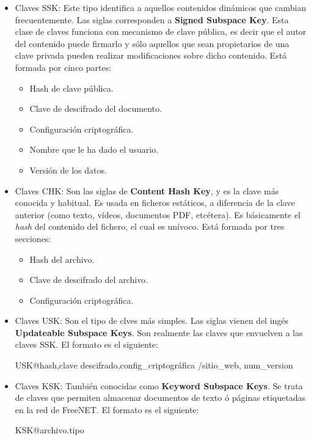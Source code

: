 \begin{itemize}
	\item {Claves SSK}: Este tipo identifica a aquellos contenidos dinámicos que cambian frecuentemente. Las siglas corresponden a \textbf{Signed Subspace Key}. Esta clase de claves funciona con mecanismo de clave pública, es decir que el autor del contenido puede firmarlo y sólo aquellos que sean propietarios de una clave privada pueden realizar modificaciones sobre dicho contenido. Está formada por cinco partes:
	\begin{itemize}
		\item {Hash de clave pública}.
		\item {Clave de descifrado del documento}.
		\item {Configuración criptográfica}.
		\item {Nombre que le ha dado el usuario}.
		\item {Versión de los datos}.
	\end{itemize}
	\item {Claves CHK}: Son las siglas de \textbf{Content Hash Key}, y es la clave más conocida y habitual. Es usada en ficheros estáticos, a diferencia de la clave anterior (como texto, vídeos, documentos PDF, etcétera). Es básicamente el \textit{hash} del contenido del fichero, el cual es unívoco. Está formada por tres secciones:
	\begin{itemize}
		\item {Hash del archivo}.
		\item {Clave de descifrado del archivo}.
		\item {Configuración criptográfica}.
	\end{itemize}
	\item {Claves USK}: Son el tipo de clves más simples. Las siglas vienen del ingés \textbf{Updateable Subspace Keys}. Son realmente las claves que envuelven a las claves SSK. El formato es el siguiente:
	
	{\selectfont 
		USK@hash,clave	descifrado,config\_criptográfica /sitio\_web, num\_version
	}
	
	\item {Claves KSK}: También conocidas como \textbf{Keyword Subspace Keys}. Se trata de claves que permiten almacenar documentos de texto ó páginas etiquetadas en la red de FreeNET.
	El formato es el siguiente: 
	
	{\selectfont 
		KSK@archivo.tipo
	}
\end{itemize}

